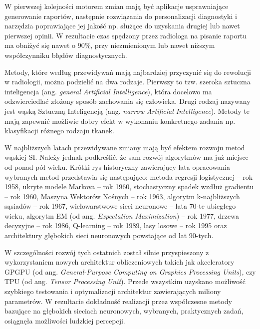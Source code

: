 W pierwszej kolejności motorem zmian mają być aplikacje usprawniające generowanie raportów, następnie rozwiązania do personalizacji diagnostyki i narzędzia poprawiające jej jakość np. służące do uzyskania drugiej lub nawet pierwszej opinii. W rezultacie czas spędzony przez radiologa na pisanie raportu ma obniżyć się nawet o 90\%, przy niezmienionym lub nawet niższym współczynniku błędów diagnostycznych.

Metody, które według przewidywań mają najbardziej przyczynić się do rewolucji w radiologii, można podzielić na dwa rodzaje. Pierwszy to tzw. szeroka sztuczna inteligencja (ang. \textit{general Artificial Intelligence}), która docelowo ma odzwierciedlać złożony sposób zachowania się człowieka. Drugi rodzaj nazywany jest wąską Sztuczną Inteligencją (ang. \textit{narrow Artificial Intelligence}). Metody te mają zapewnić możliwie dobry efekt w wykonaniu konkretnego zadania np. klasyfikacji różnego rodzaju tkanek. 

W najbliższych latach przewidywane zmiany mają być efektem rozwoju metod wąskiej SI. Należy jednak podkreślić, że sam rozwój algorytmów ma już miejsce od ponad pół wieku. Krótki rys historyczny zawierający lata opracowania wybranych metod przedstawia się następująco: metoda regresji logistycznej -- rok 1958, ukryte modele Markova -- rok 1960, stochastyczny spadek wzdłuż gradientu -- rok 1960, Maszyna Wektorów Nośnych -- rok 1963, algorytm k-najbliższych sąsiadów -- rok 1967, wielowarstwowe sieci neuronowe -- lata 70-te ubiegłego wieku, algorytm EM (od ang. \textit{Expectation Maximization}) -- rok 1977, drzewa decyzyjne -- rok 1986, Q-learning -- rok 1989, lasy losowe -- rok 1995 oraz architektury głębokich sieci neuronowych powstające od lat 90-tych. 

W szczególności rozwój tych ostatnich został silnie przyspieszony z wykorzystaniem nowych architektur obliczeniowych takich jak akceleratory GPGPU (od ang. \textit{General-Purpose Computing on Graphics Processing Units}), czy TPU (od ang. \textit{Tensor Processing Unit}). Przede wszystkim uzyskano możliwość szybkiego testowania i optymalizacji architektur zawierających miliony parametrów. W rezultacie dokładność realizacji przez współczesne metody bazujące na głębokich sieciach neuronowych, wybranych, praktycznych zadań, osiągnęła możliwości ludzkiej percepcji. 

